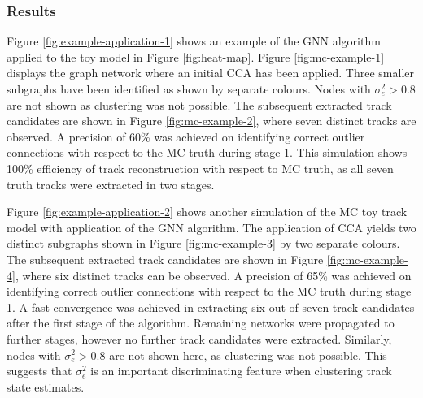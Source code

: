 \subsubsection{Results}

Figure \ref{fig:example-application-1} shows an example of the GNN algorithm applied to the toy model in Figure \ref{fig:heat-map}. Figure \ref{fig:mc-example-1} displays the graph network where an initial CCA has been applied. Three smaller subgraphs have been identified as shown by separate colours. Nodes with $\sigma_e^2 > 0.8$ are not shown as clustering was not possible. The subsequent extracted track candidates are shown in Figure \ref{fig:mc-example-2}, where seven distinct tracks are observed. A precision of 60\% was achieved on identifying correct outlier connections with respect to the MC truth during stage 1. This simulation shows 100\% efficiency of track reconstruction with respect to MC truth, as all seven truth tracks were extracted in two stages. 

Figure \ref{fig:example-application-2} shows another simulation of the MC toy track model with application of the GNN algorithm. The application of CCA yields two distinct subgraphs shown in Figure \ref{fig:mc-example-3} by two separate colours. The subsequent extracted track candidates are shown in Figure \ref{fig:mc-example-4}, where six distinct tracks can be observed. A precision of 65\% was achieved on identifying correct outlier connections with respect to the MC truth during stage 1. A fast convergence was achieved in extracting six out of seven track candidates after the first stage of the algorithm. Remaining networks were propagated to further stages, however no further track candidates were extracted. Similarly, nodes with $\sigma_e^2 > 0.8$ are not shown here, as clustering was not possible. This suggests that $\sigma_{e}^{2}$ is an important discriminating feature when clustering track state estimates. 



